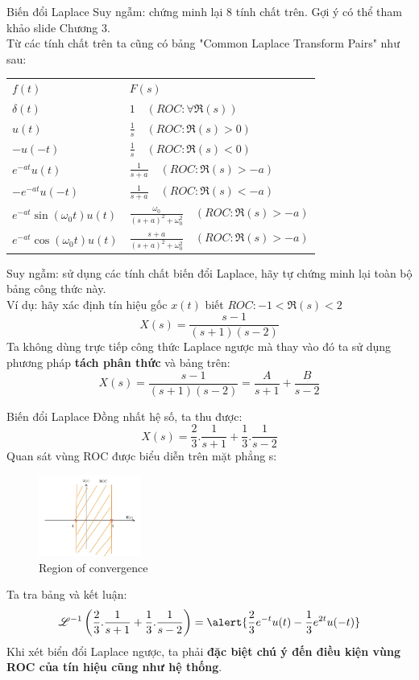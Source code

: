 \documentclass[8pt]{beamer}
\begin{document}
\begin{frame}{Biến đổi Laplace}
Suy ngẫm: chứng minh lại 8 tính chất trên. Gợi ý có thể tham khảo slide \alert{Chương 3}.
\\ Từ các tính chất trên ta cũng có bảng "Common Laplace Transform Pairs" như sau:
\begin{center}
\begin{tabular}{ |l|l| } 
 \hline
 $f(t)$ & $F(s)$ \\ 
 $\delta(t)$ & $1 \quad (ROC: \forall \Re{(s)})$ \\ 
 $u(t)$ &   $\frac{1}{s} \quad (ROC: \Re{(s)}>0)$ \\ 
 $-u(-t)$ & $\frac{1}{s} \quad (ROC: \Re{(s)}<0)$\\
 $e^{-at}u(t)$ & $\frac{1}{s+a}\quad (ROC: \Re(s)>-a)$\\
 $-e^{-at}u(-t)$ & $\frac{1}{s+a}\quad (ROC: \Re(s)<-a)$\\
 $e^{-at}\sin(\omega_{0}t)u(t)$ & $\frac{\omega_{0}}{(s+a)^2+\omega_{0}^2}\quad (ROC: \Re(s)>-a)$\\
 $e^{-at}\cos(\omega_{0}t)u(t)$ & $\frac{s+a}{(s+a)^2+\omega_{0}^2}\quad (ROC: \Re(s)>-a)$\\

 \hline
\end{tabular}
\end{center}
Suy ngẫm: sử dụng các tính chất biến đổi Laplace, hãy tự chứng minh lại toàn bộ bảng công thức này.
\\ Ví dụ: hãy xác định tín hiệu gốc $x(t)$ biết $ROC:-1<\Re{(s)}<2$
$$X(s)=\frac{s-1}{(s+1)(s-2)}$$
Ta không dùng trực tiếp công thức Laplace ngược mà thay vào đó ta sử dụng phương pháp \textbf{tách phân thức} và bảng trên:
\begin{equation*}
	X(s)=\frac{s-1}{(s+1)(s-2)}=\frac{A}{s+1}+\frac{B}{s-2}
\end{equation*}
\end{frame}
\begin{frame}{Biến đổi Laplace}
Đồng nhất hệ số, ta thu được:
$$X(s)=\frac{2}{3}.\frac{1}{s+1}+\frac{1}{3}.\frac{1}{s-2}$$
Quan sát vùng ROC được biểu diễn trên mặt phẳng s:
\begin{figure}[h]
			\includegraphics[width=0.3\textwidth]{roc.jpg}
			\caption{Region of convergence}\label{fig:re2}

		\end{figure}

Ta tra bảng và kết luận:
$$\mathscr{L}^{-1}\left(\frac{2}{3}.\frac{1}{s+1}+\frac{1}{3}.\frac{1}{s-2}\right)=\alert{\frac{2}{3}e^{-t}u(t)-\frac{1}{3}e^{2t}u(-t)}$$
Khi xét biển đổi Laplace ngược, ta phải \textbf{đặc biệt chú ý đến điều kiện vùng ROC của tín hiệu cũng như hệ thống}.
\end{frame}
\end{document}
